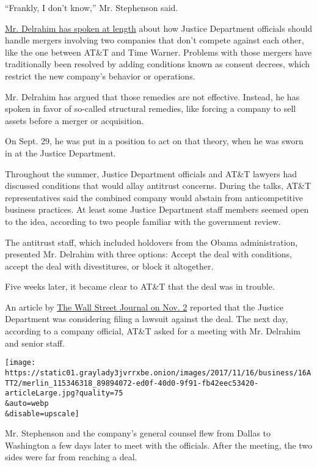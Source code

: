 ``Frankly, I don't know,'' Mr. Stephenson said.

\href{https://www.nytimes3xbfgragh.onion/2017/11/09/technology/justice-department-antitrust.html}{Mr.
Delrahim has spoken at length} about how Justice Department officials
should handle mergers involving two companies that don't compete against
each other, like the one between AT\&T and Time Warner. Problems with
those mergers have traditionally been resolved by adding conditions
known as consent decrees, which restrict the new company's behavior or
operations.

Mr. Delrahim has argued that those remedies are not effective. Instead,
he has spoken in favor of so-called structural remedies, like forcing a
company to sell assets before a merger or acquisition.

On Sept. 29, he was put in a position to act on that theory, when he was
sworn in at the Justice Department.

Throughout the summer, Justice Department officials and AT\&T lawyers
had discussed conditions that would allay antitrust concerns. During the
talks, AT\&T representatives said the combined company would abstain
from anticompetitive business practices. At least some Justice
Department staff members seemed open to the idea, according to two
people familiar with the government review.

The antitrust staff, which included holdovers from the Obama
administration, presented Mr. Delrahim with three options: Accept the
deal with conditions, accept the deal with divestitures, or block it
altogether.

Five weeks later, it became clear to AT\&T that the deal was in trouble.

An article by
\href{https://www.wsj.com/articles/u-s-weighs-suit-against-at-ts-deal-for-time-warner-1509633797}{The
Wall Street Journal on Nov. 2} reported that the Justice Department was
considering filing a lawsuit against the deal. The next day, according
to a company official, AT\&T asked for a meeting with Mr. Delrahim and
senior staff.

\texttt{[image: https://static01.graylady3jvrrxbe.onion/images/2017/11/16/business/16ATT2/merlin\_115346318\_89894072-ed0f-40d0-9f91-fb42eec53420-articleLarge.jpg?quality=75\\\&auto=webp\\\&disable=upscale]}

Mr. Stephenson and the company's general counsel flew from Dallas to
Washington a few days later to meet with the officials. After the
meeting, the two sides were far from reaching a deal.

